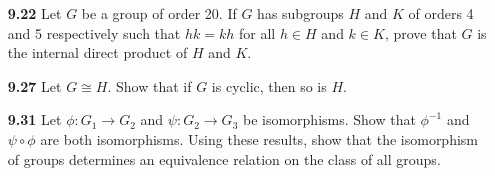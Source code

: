 \documentclass[12pt,reqno]{amsart}
\newcommand{\<}{\ensuremath{\langle}}
\renewcommand{\>}{\ensuremath{\rangle}}
\begin{document}
\begin{enumerate}[{\bf 1.}]
\vskip1cm


\vskip1cm

\item[{\bf 9.22}]
Let $G$ be a group of order 20. If $G$ has subgroups $H$ and $K$ of
orders 4 and 5 respectively such that $hk = kh$ for all $h \in H$ and
$k \in K$, prove that $G$ is the internal direct product of $H$ and $K$. 

\vskip1cm

\item[{\bf 9.27}]
Let $G \cong H$. Show that if $G$ is cyclic, then so is $H$.

\vskip1cm

\item[{\bf 9.31}]
Let $\phi : G_1 \rightarrow G_2$ and  $\psi : G_2 \rightarrow G_3$  be
isomorphisms. Show that  $\phi^{-1}$ and $\psi \circ \phi$ are both
isomorphisms. Using these results, show that the isomorphism of groups
determines an equivalence relation on the class of all groups.
 
\end{enumerate}
\end{document}
